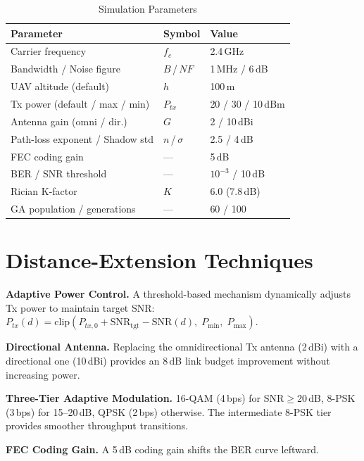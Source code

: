 \documentclass[conference]{IEEEtran}
\begin{document}
\begin{table}[t]
\centering
\caption{Simulation Parameters}
\label{tab:params}
\begin{tabular}{@{}lll@{}}
\toprule
\textbf{Parameter} & \textbf{Symbol} & \textbf{Value} \\
\midrule
Carrier frequency & $f_c$ & 2.4\,GHz \\
Bandwidth / Noise figure & $B$\,/\,$NF$ & 1\,MHz / 6\,dB \\
UAV altitude (default) & $h$ & 100\,m \\
Tx power (default / max / min) & $P_{tx}$ & 20 / 30 / 10\,dBm \\
Antenna gain (omni / dir.) & $G$ & 2 / 10\,dBi \\
Path-loss exponent / Shadow std & $n$\,/\,$\sigma$ & 2.5 / 4\,dB \\
FEC coding gain & --- & 5\,dB \\
BER / SNR threshold & --- & $10^{-3}$ / 10\,dB \\
Rician K-factor & $K$ & 6.0 (7.8\,dB) \\
GA population / generations & --- & 60 / 100 \\
\bottomrule
\end{tabular}
\end{table}

\section{Distance-Extension Techniques}

\textbf{Adaptive Power Control.} A threshold-based mechanism dynamically adjusts Tx power to maintain target SNR:
$P_{tx}(d) = \text{clip}(P_{tx,0} + \text{SNR}_\text{tgt} - \text{SNR}(d),\; P_\text{min},\; P_\text{max})$.

\textbf{Directional Antenna.} Replacing the omnidirectional Tx antenna (2\,dBi) with a directional one (10\,dBi) provides an 8\,dB link budget improvement without increasing power.

\textbf{Three-Tier Adaptive Modulation.} 16-QAM (4\,bps) for SNR$\geq$20\,dB, 8-PSK (3\,bps) for 15--20\,dB, QPSK (2\,bps) otherwise. The intermediate 8-PSK tier provides smoother throughput transitions.

\textbf{FEC Coding Gain.} A 5\,dB coding gain shifts the BER curve leftward.
\end{document}
